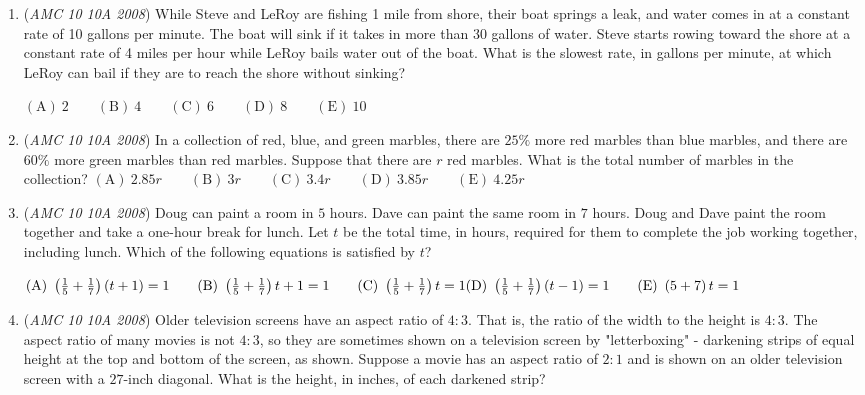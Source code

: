 \begin{enumerate}
 $\mathrm{(A)}\ \frac{1}{2}\qquad\mathrm{(B)}\ 1\qquad\mathrm{(C)}\ 2\qquad\mathrm{(D)}\ 3\qquad\mathrm{(E)}\ 4$


	\item (\textit{AMC 10 10A 2008}) While Steve and LeRoy are fishing 1 mile from shore, their boat springs a leak, and water comes in at a constant rate of 10 gallons per minute. The boat will sink if it takes in more than 30 gallons of water. Steve starts rowing toward the shore at a constant rate of 4 miles per hour while LeRoy bails water out of the boat. What is the slowest rate, in gallons per minute, at which LeRoy can bail if they are to reach the shore without sinking?


 $\mathrm{(A)}\ 2\qquad\mathrm{(B)}\ 4\qquad\mathrm{(C)}\ 6\qquad\mathrm{(D)}\ 8\qquad\mathrm{(E)}\ 10$


	\item (\textit{AMC 10 10A 2008}) In a collection of red, blue, and green marbles, there are $25\%$ more red marbles than blue marbles, and there are $60\%$ more green marbles than red marbles. Suppose that there are $r$ red marbles. What is the total number of marbles in the collection?
$\mathrm{(A)}\ 2.85r\qquad\mathrm{(B)}\ 3r\qquad\mathrm{(C)}\ 3.4r\qquad\mathrm{(D)}\ 3.85r\qquad\mathrm{(E)}\ 4.25r$


	\item (\textit{AMC 10 10A 2008}) Doug can paint a room in $5$ hours. Dave can paint the same room in $7$ hours. Doug and Dave paint the room together and take a one-hour break for lunch. Let $t$ be the total time, in hours, required for them to complete the job working together, including lunch. Which of the following equations is satisfied by $t$?


 $\mathrm{(A)}\ \left(\frac{1}{5}+\frac{1}{7}\right)\left(t+1\right)=1\qquad\mathrm{(B)}\ \left(\frac{1}{5}+\frac{1}{7}\right)t+1=1\qquad\mathrm{(C)}\ \left(\frac{1}{5}+\frac{1}{7}\right)t=1\\\mathrm{(D)}\ \left(\frac{1}{5}+\frac{1}{7}\right)\left(t-1\right)=1\qquad\mathrm{(E)}\ \left(5+7\right)t=1$


	\item (\textit{AMC 10 10A 2008}) Older television screens have an aspect ratio of $4: 3$. That is, the ratio of the width to the height is $4: 3$. The aspect ratio of many movies is not $4: 3$, so they are sometimes shown on a television screen by "letterboxing" - darkening strips of equal height at the top and bottom of the screen, as shown. Suppose a movie has an aspect ratio of $2: 1$ and is shown on an older television screen with a $27$-inch diagonal. What is the height, in inches, of each darkened strip?


\end{enumerate}
